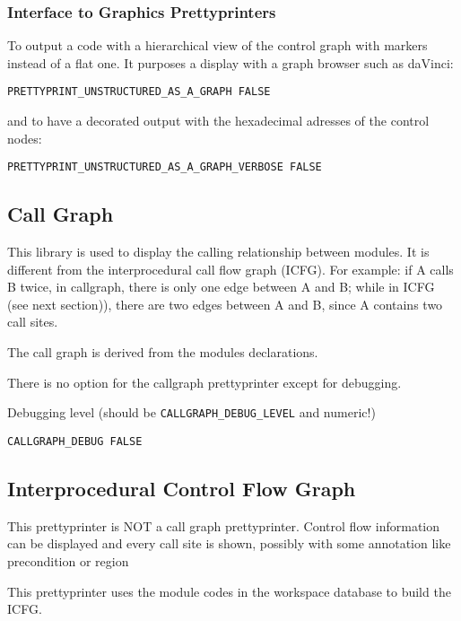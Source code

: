 \subsubsection{Interface to Graphics Prettyprinters}

To output a code with a hierarchical view of the control graph with
markers instead of a flat one. It purposes a display with a graph
browser such as daVinci:

\begin{verbatim}
PRETTYPRINT_UNSTRUCTURED_AS_A_GRAPH FALSE
\end{verbatim}

and to have a decorated output with the hexadecimal adresses of the
control nodes:
\begin{verbatim}
PRETTYPRINT_UNSTRUCTURED_AS_A_GRAPH_VERBOSE FALSE
\end{verbatim}

\subsection{Call Graph}

This library is used to display the calling relationship between
modules.  It is different from the interprocedural call flow graph
(ICFG). For  example: if A calls B twice, in
callgraph, there is only one edge between A and B; while in ICFG (see
next section)), there are two edges between A and B, since A contains
two call sites.  

The call graph is derived from the modules declarations.

There is no option for the callgraph prettyprinter except
for debugging.

Debugging level (should be \verb+CALLGRAPH_DEBUG_LEVEL+ and numeric!)

\begin{verbatim}
CALLGRAPH_DEBUG FALSE
\end{verbatim}

\subsection{Interprocedural Control Flow Graph}

This prettyprinter is NOT a call graph prettyprinter. Control flow
information can be displayed and every call site is shown, possibly with
some annotation like precondition or region

This prettyprinter uses the module codes in the workspace database to
build the ICFG.

